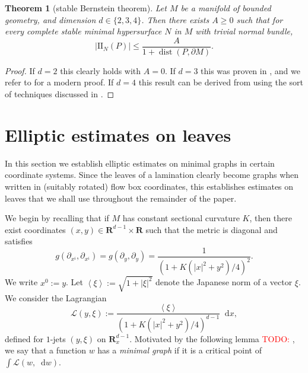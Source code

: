 \documentclass[reqno,11pt]{amsart}
\newcommand{\RR}{\mathbf{R}}
\newcommand*\dif{\mathop{}\!\mathrm{d}}
\DeclareMathOperator{\dist}{dist}
\newcommand{\Lagrange}{\mathcal L}
\newcommand{\Two}{\mathrm{I\!I}}
\newcommand{\dfn}[1]{\emph{#1}\index{#1}}
\def\Japan#1{\left \langle #1 \right \rangle}
\newtheorem{theorem}{Theorem}[section]
\newtheorem{proposition}[theorem]{Proposition}
\theoremstyle{definition}
\numberwithin{equation}{section}
\newcommand\todo[1]{\textcolor{red}{TODO: #1}}
\begin{document}

\begin{theorem}[stable Bernstein theorem]
	Let $M$ be a manifold of bounded geometry, and dimension $d \in \{2, 3, 4\}$.
	Then there exists $A \geq 0$ such that for every complete stable minimal hypersurface $N$ in $M$ with trivial normal bundle,
	$$|\Two_N(P)| \leq \frac{A}{1 + \dist(P, \partial M)}.$$
\end{theorem}
\begin{proof}
	If $d = 2$ this clearly holds with $A = 0$.
	If $d = 3$ this was proven in \cite{Schoen2016}, and we refer to \cite[Theorem 2.10]{colding2011course} for a modern proof.
	If $d = 4$ this result can be derived from \cite[Theorem 1]{Chodosh2021} using the sort of techniques discussed in \cite[\S3]{White13}.
\end{proof}

\section{Elliptic estimates on leaves}\label{Leaf estimates}
In this section we establish elliptic estimates on minimal graphs in certain coordinate systems.
Since the leaves of a lamination clearly become graphs when written in (suitably rotated) flow box coordinates, this establishes estimates on leaves that we shall use throughout the remainder of the paper.

We begin by recalling that if $M$ has constant sectional curvature $K$, then there exist coordinates $(x, y) \in \RR^{d - 1} \times \RR$ such that the metric is diagonal and satisfies
\begin{equation}\label{CSC metric}
	g(\partial_{x^i}, \partial_{x^i}) = g(\partial_y, \partial_y) = \frac{1}{(1 + K(|x|^2 + y^2)/4)^2}.
\end{equation}
We write $x^0 := y$.
Let $\Japan \xi := \sqrt{1 + |\xi|^2}$ denote the Japanese norm of a vector $\xi$.
We consider the Lagrangian 
$$\Lagrange(y, \xi) := \frac{\Japan{\xi}}{(1 + K(|x|^2 + y^2)/4)^{d - 1}} \dif x,$$
defined for $1$-jets $(y, \xi)$ on $\RR^{d - 1}_x$.
Motivated by the following lemma \todo{\cite{BackusFLG}}, we say that a function $w$ has a \dfn{minimal graph} if it is a critical point of $\int \Lagrange(w, \dif w)$.
\end{document}

